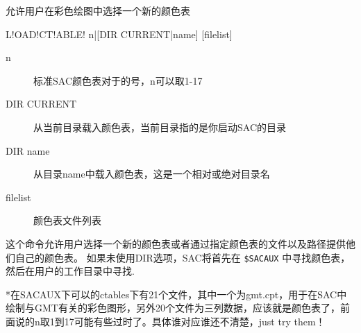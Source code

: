 \label{cmd:loadctable}

允许用户在彩色绘图中选择一个新的颜色表

\begin{SACSTX}
L!OAD!CT!ABLE! n|[DIR CURRENT|name] [filelist]
\end{SACSTX}

\begin{description}
\item [n] 标准SAC颜色表对于的号，n可以取1-17
\item [DIR CURRENT] 从当前目录载入颜色表，当前目录指的是你启动SAC的目录
\item [DIR name] 从目录name中载入颜色表，这是一个相对或绝对目录名
\item [filelist] 颜色表文件列表
\end{description}

这个命令允许用户选择一个新的颜色表或者通过指定颜色表的文件以及路径提供他们自己的颜色表。
如果未使用DIR选项，SAC将首先在 \verb|$SACAUX| 中寻找颜色表，然后在用户的工作目录中寻找.

*在SACAUX下可以的ctables下有21个文件，其中一个为gmt.cpt，用于在SAC中绘制与GMT有关的彩色图形，另外20个文件为三列数据，应该就是颜色表了，前面说的n取1到17可能有些过时了。具体谁对应谁还不清楚，just try them！

